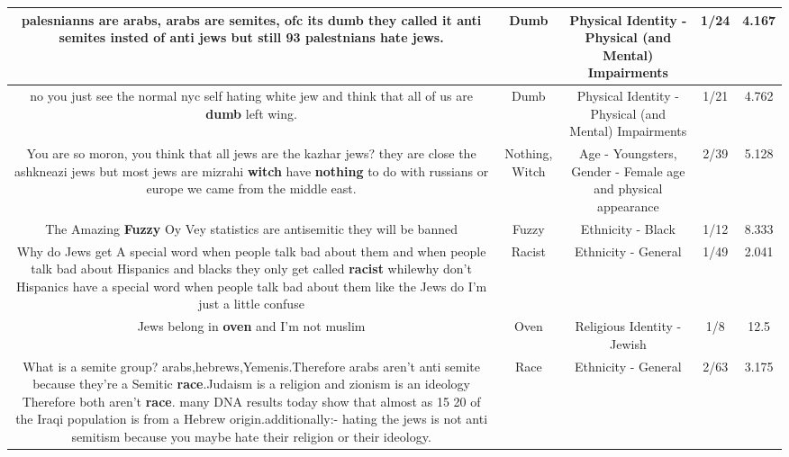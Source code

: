 \documentclass[11pt]{article}
\newlength\mylength
\begin{document}
\begin{center}
\begin{longtable}{|C{.65\mylength}|C{.30\mylength}|C{.12\mylength}|C{.12\mylength}|C{.12\mylength}|}
  \small palesnianns are arabs, arabs are semites, ofc its \textbf{dumb} they called it anti semites insted of anti jews but still 93 palestnians  hate jews.\normalsize   & Dumb & Physical Identity - Physical (and Mental) Impairments & 1/24 & 4.167 \\  \hline
  \small no you just see the normal nyc self hating white jew and think that all of us are \textbf{dumb} left wing.\normalsize   & Dumb & Physical Identity - Physical (and Mental) Impairments & 1/21 & 4.762 \\  \hline
  \small You are so moron, you think that all jews are the kazhar jews? they are close the ashkneazi jews but most jews are mizrahi \textbf{witch} have \textbf{nothing} to do with russians or europe we came from the middle east.\normalsize   & Nothing, Witch & Age - Youngsters, Gender - Female age and physical appearance & 2/39 & 5.128 \\  \hline
  \small The Amazing \textbf{Fuzzy} Oy Vey statistics are antisemitic they will be banned\normalsize   & Fuzzy & Ethnicity - Black & 1/12 & 8.333 \\  \hline
  \small Why do Jews get A special word when people talk bad about them and when people talk bad about Hispanics and blacks they only get called \textbf{racist} whilewhy don't Hispanics have a special word when people talk bad about them like the Jews do I'm just a little confuse\normalsize   & Racist & Ethnicity - General & 1/49 & 2.041 \\  \hline
  \small Jews belong in \textbf{oven} and I'm not muslim\normalsize   & Oven & Religious Identity - Jewish & 1/8 & 12.5 \\  \hline
  \small What is a semite group? arabs,hebrews,Yemenis.Therefore arabs aren't anti semite because they're a Semitic \textbf{race}.Judaism is a religion and zionism is an ideology Therefore both aren't \textbf{race}. many DNA  results today show that almost as 15 20 of the Iraqi population is from a Hebrew origin.additionally:- hating the jews is not anti semitism because you maybe hate their religion or their ideology.\normalsize   & Race & Ethnicity - General & 2/63 & 3.175 \\  \hline

\end{longtable}
\end{center}
\end{document}
